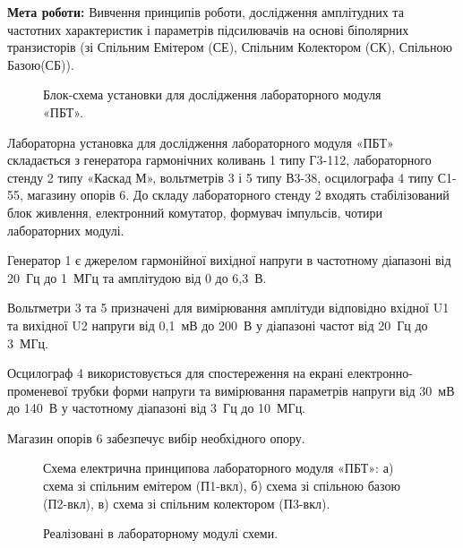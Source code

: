 \documentclass[a4paper,14pt]{extreport}
\begin{document}
\textbf{Мета роботи:} Вивчення принципів роботи, дослідження амплітудних та частотних характеристик і параметрів підсилювачів на основі біполярних транзисторів (зі Спільним Емітером (СЕ), Спільним Колектором (СК), Спільною Базою(СБ)).



\begin{figure}[h]
\caption{Блок-схема установки для дослідження лабораторного модуля «ПБТ».}
\label{ris1}
\end{figure}
Лабораторна установка для дослідження лабораторного модуля «ПБТ» складається з генератора гармонічних коливань 1 типу Г3-112, лабораторного стенду 2 типу «Каскад М», вольтметрів 3 і 5 типу В3-38, осцилографа 4 типу С1-55, магазину опорів 6. До складу лабораторного стенду 2 входять стабілізований блок живлення, електронний комутатор, формувач імпульсів, чотири лабораторних модулі.\par
Генератор 1 є джерелом гармонійної вихідної напруги в частотному діапазоні від 20 Гц до 1 МГц та амплітудою від 0 до 6,3 В.\par
Вольтметри 3 та 5 призначені для вимірювання амплітуди відповідно вхідної U1 та вихідної U2 напруги від 0,1 мВ до 200 В у діапазоні частот від 20 Гц до 3 МГц.\par
Осцилограф 4 використовується для спостереження на екрані електронно-променевої трубки форми напруги та вимірювання параметрів напруги від 30 мВ до 140 В у частотному діапазоні від 3 Гц до 10 МГц.\par
Магазин опорів 6 забезпечує вибір необхідного опору.
\begin{landscape}
\begin{figure}[h]
\label{ris5}
\caption{Схема електрична принципова лабораторного модуля «ПБТ»:
а) схема зі спільним емітером (П1-вкл), б) схема зі спільною базою
(П2-вкл), в) схема зі спільним колектором (П3-вкл).}
\end{figure}
\end{landscape}


\begin{figure}[h]
\label{ris6}
\caption{Реалізовані в лабораторному модулі схеми.}
\end{figure}
\end{document}
